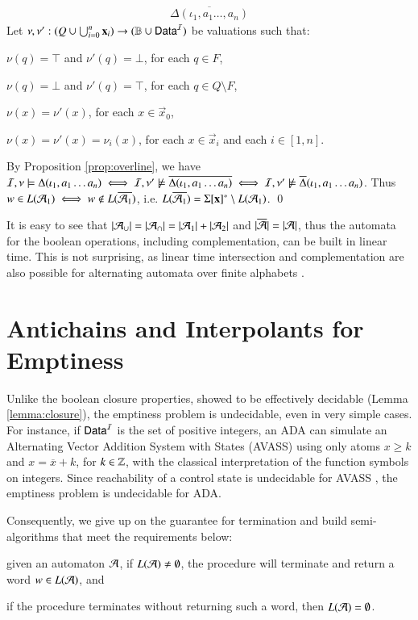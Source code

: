 \documentclass[10pt,conference,letterpaper,twocolumn]{IEEEtran}
\begin{document}
{\[\begin{array}{lcl}
  \overline{\Delta(\iota_1,a_1\ldots,a_n)}
  \end{array}\]
  Let $\nu,\nu' : (Q \cup \bigcup_{i=0}^n\mathbf x_i) \rightarrow (\mathbb{B}
  \cup \mathsf{Data}^{\mathcal{I}})$ be valuations such that: \begin{compactitem}
  \item $\nu(q) = \top$ and $\nu'(q) = \bot$, for each $q \in F$, 
  \item $\nu(q) = \bot$ and $\nu'(q) = \top$, for each $q \in Q \setminus F$, 
  \item $\nu(x) = \nu'(x)$, for each $x \in \vec{x}_0$, 
  \item $\nu(x) = \nu'(x) = \nu_i(x)$, for each $x \in \vec{x}_i$ and each $i
    \in [1,n]$.
  \end{compactitem}
  By Proposition \ref{prop:overline}, we have $\mathcal{I},\nu \models
  \Delta(\iota_1,a_1 \ldots a_n) \iff \mathcal{I},\nu' \not\models
  \overline{\Delta(\iota_1,a_1 \ldots a_n)} \iff \mathcal{I},\nu' \not\models
  \overline{\Delta}(\iota_1,a_1 \ldots a_n)$. Thus $w \in L(\mathcal{A}_1) \iff
  w \not\in L(\overline{\mathcal{A}_1})$, i.e. $L(\overline{\mathcal{A}_1}) =
  \Sigma[\mathbf x]^* \setminus L(\mathcal{A}_1)$. \qed}

It is easy to see that ${|{\mathcal{A}_\cup}|} = {|{\mathcal{A}_\cap}|} = {|{\mathcal{A}_1}|} +
{|{\mathcal{A}_2}|}$ and ${|{\overline{\mathcal{A}}}|} = {|{\mathcal{A}}|}$, thus the automata
for the boolean operations, including complementation, can be built in
linear time. This is not surprising, as linear time intersection and
complementation are also possible for alternating automata over finite
alphabets \cite{ChandraKozenStockmeyer81}.

\section{Antichains and Interpolants for Emptiness}

Unlike the boolean closure properties, showed to be effectively
decidable (Lemma \ref{lemma:closure}), the emptiness problem is
undecidable, even in very simple cases. For instance, if $\mathsf{Data}^{\mathcal{I}}$ is
the set of positive integers, an ADA can simulate an Alternating
Vector Addition System with States (AVASS) \cite{LazicSchmitz14} using
only atoms $x \geq k$ and $x = \overline{x} + k$, for $k \in {\bf \mathbb{Z}}$,
with the classical interpretation of the function symbols on
integers. Since reachability of a control state is undecidable for
AVASS \cite{LINCOLN92}, the emptiness problem is undecidable for ADA.

Consequently, we give up on the guarantee for termination and build
semi-algorithms that meet the requirements below: \begin{compactenum}[(i)]
\item given an automaton $\mathcal{A}$, if $L(\mathcal{A}) \neq\emptyset$, the procedure
  will terminate and return a word $w \in L(\mathcal{A})$, and
%
\item if the procedure terminates without returning such a word, then
  $L(\mathcal{A}) = \emptyset$.
\end{compactenum}
\end{document}
